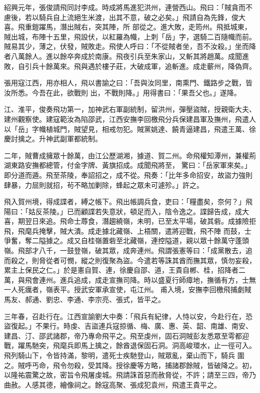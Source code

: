 \begin{pinyinscope}
 紹興元年，張俊請飛同討李成。時成將馬進犯洪州，連營西山。飛曰：「賊貪而不慮後，若以騎兵自上流絕生米渡，出其不意，破之必矣。」飛請自為先鋒，俊大喜。飛重鎧躍馬，潛出賊右，突其陣，所
 部從之。進大敗，走筠州。飛抵城東，賊出城，布陣十五里，飛設伏，以紅羅為幟，上刺「岳」字，選騎二百隨幟而前。賊易其少，薄之，伏發，賊敗走。飛使人呼曰：「不從賊者坐，吾不汝殺。」坐而降者八萬餘人。進以餘卒奔成於南康。飛夜引兵至朱家山，又斬其將趙萬。成聞進敗，自引兵十餘萬來。飛與遇於樓子莊，大破成軍，追斬進。成走蘄州，降偽齊。



 張用寇江西，用亦相人，飛以書諭之曰：「吾與汝同里，南熏門、鐵路步之戰，皆汝所悉。今吾在此，欲戰則
 出，不戰則降。」用得書曰：「果吾父也。」遂降。



 江、淮平，俊奏飛功第一，加神武右軍副統制，留洪州，彈壓盜賊，授親衛大夫、建州觀察使。建寇範汝為陷邵武，江西安撫李回檄飛分兵保建昌軍及撫州，飛遣人以「岳」字幟植城門，賊望見，相戒勿犯。賊黨姚達、饒青逼建昌，飛遣王萬、徐慶討擒之。升神武副軍都統制。



 二年，賊曹成擁眾十餘萬，由江公歷湖湘，據道、賀二州。命飛權知潭州，兼權荊湖東路安撫都總管，付金字牌、黃旗招成。成聞飛將至，
 驚曰：「岳家軍來矣。」即分道而遁。飛至茶陵，奉詔招之，成不從。飛奏：「比年多命招安，故盜力強則肆暴，力屈則就招，茍不略加剿除，蜂起之眾未可遽殄。」許之。



 飛入賀州境，得成諜者，縛之帳下。飛出帳調兵食，吏曰：「糧盡矣，奈何？」飛陽曰：「姑反茶陵。」已而顧諜若失意狀，頓足而入，陰令逸之。諜歸告成，成大喜，期翌日來追。飛命士蓐食，潛趨繞嶺，未明，已至太平場，破其砦。成據險拒飛，飛麾兵掩擊，賊大潰。成走據北藏嶺、上梧關，遣將迎戰，飛不陣
 而鼓，士爭奮，奪二隘據之。成又自桂嶺置砦至北藏嶺，連控隘道，親以眾十餘萬守蓬頭嶺。飛部才八千，一鼓登嶺，破其眾，成奔連州。飛謂張憲等曰：「成黨散去，追而殺之，則脅從者可憫，縱之則復聚為盜。今遣若等誅其酋而撫其眾，慎勿妄殺，累主上保民之仁。」於是憲自賀、連，徐慶自邵、道，王貴自郴、桂，招降者二萬，與飛會連州。進兵追成，成走宣撫司降。時以盛夏行師瘴地，撫循有方，士無一人死癘者，嶺表平。授武安軍承宣使，屯江州。
 甫入境，安撫李回檄飛捕劇賊馬友、郝通、劉忠、李通、李宗亮、張式，皆平之。



 三年春，召赴行在。江西宣諭劉大中奏：「飛兵有紀律，人恃以安，今赴行在，恐盜復起。」不果行。時虔、吉盜連兵寇掠循、梅、廣、惠、英、韶、南雄、南安、建昌、汀、邵武諸郡，帝乃專命飛平之。飛至虔州，固石洞賊彭友悉眾至雩都迎戰，躍馬馳突，飛麾兵即馬上擒之，餘酋退保固石洞。洞高峻環水，止一徑可入。飛列騎山下，令皆持滿，黎明，遣死士疾馳登山，賊眾亂，棄山而下，騎兵
 圍之。賊呼丐命，飛令勿殺，受其降。授徐慶等方略，捕諸郡餘賊，皆破降之。初，以隆祐震驚之故，密旨令飛屠虔城。飛請誅首惡而赦脅從，不許；請至三四，帝乃曲赦。人感其德，繪像祠之。餘寇高聚、張成犯袁州，飛遣王貴平之。




\end{pinyinscope}
